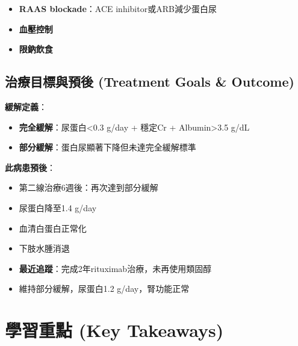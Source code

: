 \documentclass[12pt,a4paper]{article}
\begin{document}
\begin{itemize}[leftmargin=*]
    \item \textbf{RAAS blockade}：ACE inhibitor或ARB減少蛋白尿
    \item \textbf{血壓控制}
    \item \textbf{限鈉飲食}
\end{itemize}

\subsection{治療目標與預後 (Treatment Goals \& Outcome)}

\textbf{緩解定義}：
\begin{itemize}[leftmargin=*]
    \item \textbf{完全緩解}：尿蛋白<0.3 g/day + 穩定Cr + Albumin>3.5 g/dL
    \item \textbf{部分緩解}：蛋白尿顯著下降但未達完全緩解標準
\end{itemize}

\textbf{此病患預後}：
\begin{itemize}[leftmargin=*]
    \item 第二線治療6週後：再次達到部分緩解
    \item 尿蛋白降至1.4 g/day
    \item 血清白蛋白正常化
    \item 下肢水腫消退
    \item \textbf{最近追蹤}：完成2年rituximab治療，未再使用類固醇
    \item 維持部分緩解，尿蛋白1.2 g/day，腎功能正常
\end{itemize}

\section{學習重點 (Key Takeaways)}
\end{document}
